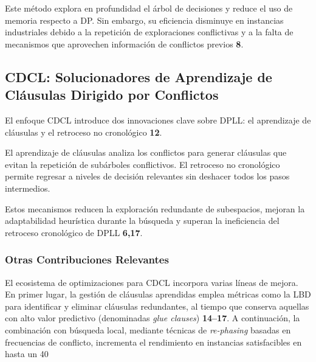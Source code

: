 Este método explora en profundidad el árbol de decisiones y reduce el uso de memoria respecto a DP. Sin embargo, su eficiencia disminuye en instancias industriales debido a la repetición de exploraciones conflictivas y a la falta de mecanismos que aprovechen información de conflictos previos \textbf{8}.

\subsection{CDCL: Solucionadores de Aprendizaje de Cláusulas Dirigido por Conflictos}
El enfoque CDCL introduce dos innovaciones clave sobre DPLL: el aprendizaje de cláusulas y el retroceso no cronológico \textbf{12}.  

El aprendizaje de cláusulas analiza los conflictos para generar cláusulas que evitan la repetición de subárboles conflictivos. El retroceso no cronológico permite regresar a niveles de decisión relevantes sin deshacer todos los pasos intermedios.  

Estos mecanismos reducen la exploración redundante de subespacios, mejoran la adaptabilidad heurística durante la búsqueda y superan la ineficiencia del retroceso cronológico de DPLL \textbf{6,17}.

\subsubsection{Otras Contribuciones Relevantes}
\label{subsubsec:otras-mejoras}

El ecosistema de optimizaciones para CDCL incorpora varias líneas de mejora. En primer lugar, la gestión de cláusulas aprendidas emplea métricas como la LBD para identificar y eliminar cláusulas redundantes, al tiempo que conserva aquellas con alto valor predictivo (denominadas \textit{glue clauses}) \textbf{14–17}. A continuación, la combinación con búsqueda local, mediante técnicas de \textit{re-phasing} basadas en frecuencias de conflicto, incrementa el rendimiento en instancias satisfacibles en hasta un 40 %


